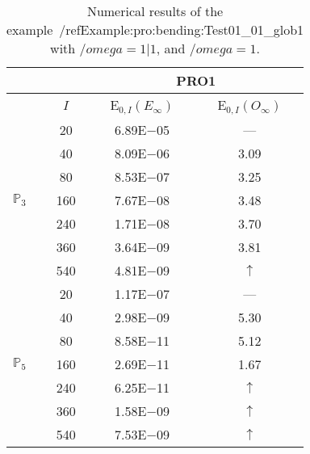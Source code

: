 \begin{table}[H]
\caption{Numerical results of the example~/ref{Example:pro:bending:Test01_01_glob1} with $/omega=1|1$, and $/omega=1$.}
\setlength{\tabcolsep}{5pt}
\centering
\begin{tabular}{@{}l c c c@{}}
\toprule
 &  & \multicolumn{2}{c}{PRO1}\\
\midrule
 & $I$ & E$_{0,I}(E_{\infty})$ & E$_{0,I}(O_{\infty})$\\
\midrule
\multirow{7}{*}{$\mathbb{P}_{3}$}
 & 20 & 6.89E$-$05 & ---\\
 & 40 & 8.09E$-$06 & 3.09\\
 & 80 & 8.53E$-$07 & 3.25\\
 & 160 & 7.67E$-$08 & 3.48\\
 & 240 & 1.71E$-$08 & 3.70\\
 & 360 & 3.64E$-$09 & 3.81\\
 & 540 & 4.81E$-$09 & $\uparrow$\\
\midrule
\multirow{7}{*}{$\mathbb{P}_{5}$}
 & 20 & 1.17E$-$07 & ---\\
 & 40 & 2.98E$-$09 & 5.30\\
 & 80 & 8.58E$-$11 & 5.12\\
 & 160 & 2.69E$-$11 & 1.67\\
 & 240 & 6.25E$-$11 & $\uparrow$\\
 & 360 & 1.58E$-$09 & $\uparrow$\\
 & 540 & 7.53E$-$09 & $\uparrow$\\
\bottomrule
\end{tabular}
\label{Table:pRO:test_01_01_test1_pro3}
\end{table}

